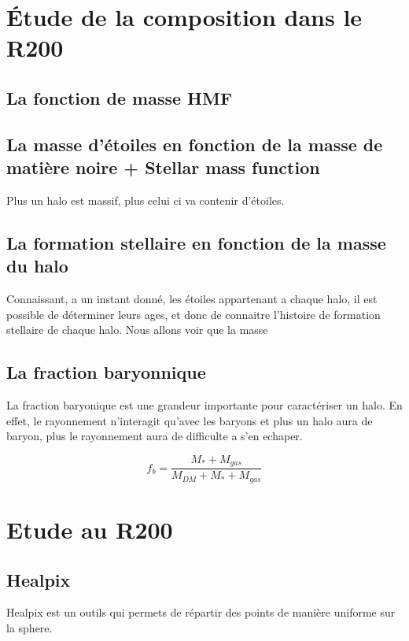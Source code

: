 \section{Étude de la composition dans le R200}


\subsection{La fonction de masse HMF}

\subsection{La masse d'étoiles en fonction de la masse de matière noire + Stellar mass function}
Plus un halo est massif, plus celui ci va contenir d'étoiles.



\subsection{La formation stellaire en fonction de la masse du halo}
Connaissant, a un instant donné, les étoiles appartenant a chaque halo, il est possible de déterminer leurs ages, et donc de connaitre l'histoire de formation stellaire de chaque halo.
Nous allons voir que la masse 

\subsection{La fraction baryonnique}
La fraction baryonique est une grandeur importante pour caractériser un halo.
En effet, le rayonnement n'interagit qu'avec les baryons et plus un halo aura de baryon, plus le rayonnement aura de difficulte a s'en echaper.

\begin{equation}
f_b = \frac{M_* + M_{gas} }{M_{DM} + M_* + M_{gas} }
\end{equation}




\section{Etude au R200}

\subsection{Healpix}
\label{sec:healpix}

Healpix est un outils qui permets de répartir des points de manière uniforme sur la sphere.

